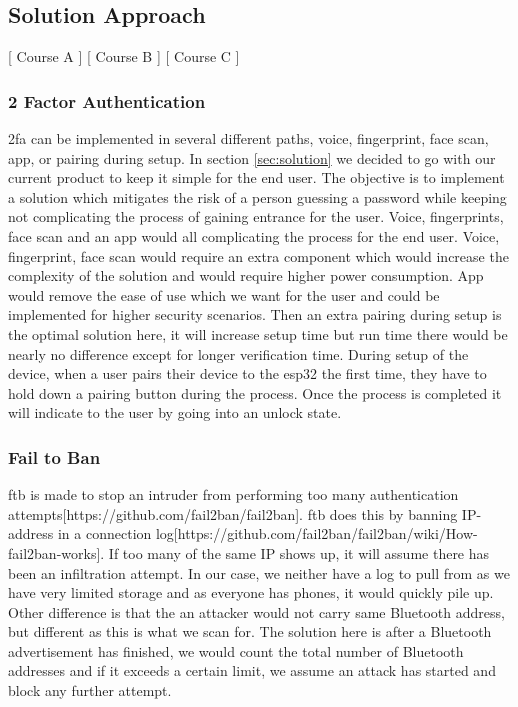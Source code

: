 \subsection{Solution Approach}
[ Course A ] [ Course B ] [ Course C ] 
\newline
\subsubsection{2 Factor Authentication}
\gls{2fa} can be implemented in several different paths, voice, fingerprint, face scan, app, or pairing during setup. In section \ref{sec:solution} we decided to go with our current product to keep it simple for the end user. The objective is to implement a solution which mitigates the risk of a person guessing a password while keeping not complicating the process of gaining entrance for the user. Voice, fingerprints, face scan and an app would all complicating the process for the end user. Voice, fingerprint, face scan would require an extra component which would increase the complexity of the solution and would require higher power consumption. App would remove the ease of use which we want for the user and could be implemented for higher security scenarios. Then an extra pairing during setup is the optimal solution here, it will increase setup time but run time there would be nearly no difference except for longer verification time. During setup of the device, when a user pairs their device to the esp32 the first time, they have to hold down a pairing button during the process. Once the process is completed it will indicate to the user by going into an unlock state.

\subsubsection{Fail to Ban}
\gls{ftb} is made to stop an intruder from performing too many authentication attempts[https://github.com/fail2ban/fail2ban]. \gls{ftb} does this by banning IP-address in a connection log[https://github.com/fail2ban/fail2ban/wiki/How-fail2ban-works]. If too many of the same IP shows up, it will assume there has been an infiltration attempt. In our case, we neither have a log to pull from as we have very limited storage and as everyone has phones, it would quickly pile up. Other difference is that the an attacker would not carry same Bluetooth address, but different as this is what we scan for. The solution here is after a Bluetooth advertisement has finished, we would count the total number of Bluetooth addresses and if it exceeds a certain limit, we assume an attack has started and block any further attempt.